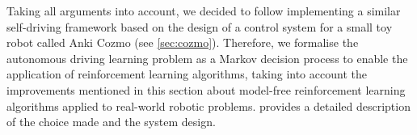 Taking all arguments into account, we decided to follow \cite{kendall2019learning} implementing a similar self-driving framework based on the design of a control system for a small toy robot called Anki Cozmo (see \vref{sec:cozmo}). Therefore, we formalise the autonomous driving learning problem as a Markov decision process to enable the application of reinforcement learning algorithms, taking into account the improvements mentioned in this section about model-free reinforcement learning algorithms applied to real-world robotic problems.  provides a detailed description of the choice made and the system design.







